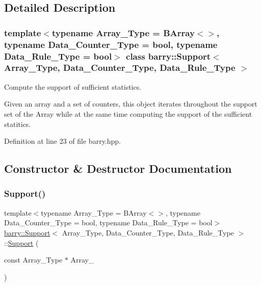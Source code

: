\subsection{Detailed Description}
\subsubsection*{template$<$typename Array\+\_\+\+Type = B\+Array$<$$>$, typename Data\+\_\+\+Counter\+\_\+\+Type = bool, typename Data\+\_\+\+Rule\+\_\+\+Type = bool$>$\newline
class barry\+::\+Support$<$ Array\+\_\+\+Type, Data\+\_\+\+Counter\+\_\+\+Type, Data\+\_\+\+Rule\+\_\+\+Type $>$}

Compute the support of sufficient statistics. 

Given an array and a set of counters, this object iterates throughout the support set of the Array while at the same time computing the support of the sufficient statitics. 

Definition at line 23 of file barry.\+hpp.



\subsection{Constructor \& Destructor Documentation}
\mbox{\label{classbarry_1_1_support_ab34144acc225be907c1403b06573b016}} 
\subsubsection{\texorpdfstring{Support()}{Support()}\hspace{0.1cm}{\footnotesize\ttfamily [1/3]}}
{\footnotesize\ttfamily template$<$typename Array\+\_\+\+Type = B\+Array$<$$>$, typename Data\+\_\+\+Counter\+\_\+\+Type = bool, typename Data\+\_\+\+Rule\+\_\+\+Type = bool$>$ \\
\hyperlink{classbarry_1_1_support}{barry\+::\+Support}$<$ Array\+\_\+\+Type, Data\+\_\+\+Counter\+\_\+\+Type, Data\+\_\+\+Rule\+\_\+\+Type $>$\+::\hyperlink{classbarry_1_1_support}{Support} (\begin{DoxyParamCaption}\item[{const Array\+\_\+\+Type $\ast$}]{Array\+\_\+ }\end{DoxyParamCaption})\hspace{0.3cm}{\ttfamily [inline]}}



